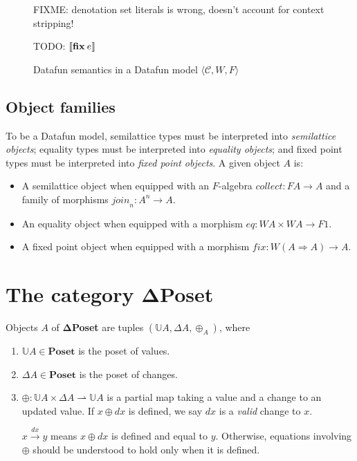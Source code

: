 \documentclass{rntz}\usepackage[a5]{rntzgeometry}\usepackage[fullwidth=130mm,width=330pt,]{narrow}
\newcommand\mathvar[1]{\ensuremath{#1}} %
\renewcommand\mathvar[1]{\ensuremath{\mathit{#1}}} %
\newcommand\todo[1]{{\color{ACMRed}#1}}
\newcommand\cat\textbf
\newcommand\CP{\cat{\texorpdfstring{$\boldsymbol\Delta$Poset}{DeltaPoset}}}
\newcommand\Poset{\cat{Poset}}
\newcommand\termO{1}
\newcommand\D\Delta
\newcommand\x\times
\newcommand\pto\rightharpoonup
\newcommand\tuple[1]{\langle{#1}\rangle}
\newcommand\<{\mskip 4mu plus 4mu minus 1mu}
\newcommand\dx{\mathvar{dx}}
\newcommand\valfn{\ensuremath{\mathbb{U}}}
\newcommand\vals{\valfn}
\newcommand\chgs[1]{\D{#1}}
\newcommand\upd{\mathbin{\oplus}}
\newcommand\updfn{\ensuremath{{\upd}}}
\newcommand\kwname\textbf
\newcommand\efix{\kwname{fix}\<}
\newcommand\den[1]{\ensuremath{\left\llbracket{#1}\right\rrbracket}}
\newcommand\homto\Rightarrow
\newcommand\catC{\ensuremath{\mathcal{C}}}
\newcommand\down{\ensuremath{F}}
\newcommand\disco{\ensuremath{W}}
\newcommand\downof[1]{\down #1}
\newcommand\discof[1]{\ensuremath{\disco #1}}
\newcommand\morph\mathit
\newcommand\validarrow\to
\newcommand\valid[1]{\mathrel{\overset{#1}{\validarrow}}}
\newcommand\vld[3]{{#2 \valid{#1} #3}}
\begin{document}
\begin{figure*}[p]
  \todo{FIXME: denotation set literals is wrong, doesn't account for context stripping!}

  \todo{TODO: $\den{\efix e}$}

  \caption{Datafun semantics in a Datafun model $\tuple{\catC, \disco, \down}$}
  \label{fig:general-semantics}
\end{figure*}


\subsection{Object families}
\label{sec:object-families}

To be a Datafun model, semilattice types must be interpreted into
\emph{semilattice objects}; equality types must be interpreted into
\emph{equality objects}; and fixed point types must be interpreted into
\emph{fixed point objects}. A given object $A$ is:


\begin{itemize}
\item A semilattice object when equipped with an \down-algebra $\morph{collect} :
  \downof{A} \to A$ and a family of morphisms $\morph{join}_n : A^n \to A$.

\item An equality object when equipped with a morphism $\morph{eq} : \discof A \x
\discof A \to \downof \termO$.

\item A fixed point object when equipped with a morphism $\morph{fix} : \discof{(A
  \homto A)} \to A$.
\end{itemize}


\section{The category \CP}
\label{sec:changeposets}

Objects $A$ of \CP{} are tuples $(\vals A, \chgs A, \updfn_A)$, where
%
\begin{enumerate}
\item $\vals A \in \Poset$ is the poset of values.

\item $\chgs A \in \Poset$ is the poset of changes.

\item $\updfn : \vals A \x \chgs A \pto \vals A$ is a partial map taking a value
  and a change to an updated value. If $x \upd \dx$ is defined, we say $\dx$ is a
  \emph{valid} change to $x$.

  $\vld{\dx} x y$ means $x \upd \dx$ is defined and equal to $y$. Otherwise,
  equations inv\-olv\-ing \updfn{} should be understood to hold only when it is
  defined.
\end{enumerate}
\end{document}

